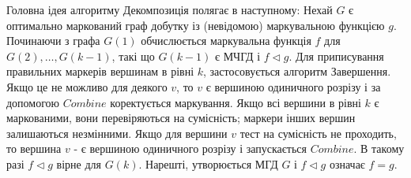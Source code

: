 Головна ідея алгоритму Декомпозиція полягає в наступному: Нехай $G$ є оптимально маркований граф добутку із (невідомою) маркувальною функцією $g$.
Починаючи з графа $G(1)$ обчислюється маркувальна функція $f$ для $G(2),\dots,G(k-1)$, такі що $G(k-1)$ є МЧГД і $f \triangleleft g$.
Для приписування правильних маркерів вершинам в рівні $k$, застосовується алгоритм Завершення.
Якщо це не можливо для деякого $v$, то $v$ є вершиною одиничного розрізу і за допомогою $Combine$ коректується маркування.
Якщо всі вершини в рівні $k$ є маркованими, вони перевіряються на сумісність; маркери інших вершин залишаються незмінними.
Якщо для вершини $v$ тест на сумісність не проходить, то вершина $v$ - є вершиною одиничного розрізу і запускається $Combine$.
В такому разі $f \triangleleft g$ вірне для $G(k)$.
Нарешті, утворюється МГД $G$ і $f \triangleleft g$ означає $f=g$.





